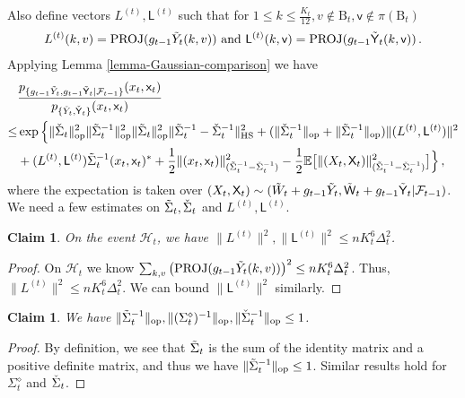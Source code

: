 \documentclass[11pt]{article}
\newtheorem{Claim}[Theorem]{Claim}
\numberwithin{equation}{section}
\begin{document}
Also define vectors $L^{(t)},\mathsf{L}^{(t)}$ such that for $1\leq k\leq \frac{K_t}{12}, v\not\in \mathrm{B}_t, \mathsf v\not\in \pi(\mathrm{B}_t)$ 
\begin{align*}
    L^{(t)} (k,v) = \mathrm{PROJ} ( g_{t-1} \Tilde{Y}_{t}(k,v) ) \mbox{ and }\mathsf{L}^{(t)} (k,\mathsf{v}) = \mathrm{PROJ}( g_{t-1} \Tilde{\mathsf{Y}}_{t}(k,\mathsf{v}) ) \,.
\end{align*}
Applying Lemma \ref{lemma-Gaussian-comparison} we have
\begin{align}
    & \frac{ p_{ \{ g_{t-1} \Tilde{Y}_t , g_{t-1} \Tilde{\mathsf{Y}}_t | \mathcal{F}_{t-1} \} } (x_{t}, \mathsf{x}_{t}) }{ p_{ \{ \Check{Y}_t ,   \Check{\mathsf{Y}}_t \} } (x_{t}, \mathsf{x}_{t}) } \nonumber \\
    \leq & \exp \Big\{ \| \Check{\Sigma}_t \|_{\mathrm{op}}^2 \| \Tilde{\Sigma}_{t}^{-1} \|_{\mathrm{op}}^2 \| \Tilde{\Sigma}_{t} \|_{\mathrm{op}}^2 \| \Tilde{\Sigma}_{t}^{-1} - \Check{\Sigma}_{t}^{-1} \|_{\mathrm{HS}}^2 + ( \| \Check{\Sigma}_{t}^{-1} \|_{\mathrm{op}} + \| \Tilde{\Sigma}_{t}^{-1} \|_{\mathrm{op}} ) \| ( L^{(t)} , \mathsf{L}^{(t)} ) \|^2 \nonumber \\
    & + ( L^{(t)} , \mathsf{L}^{(t)} ) \Tilde{\Sigma}_{t}^{-1} ( x_{t},\mathsf{x}_{t} )^{*} 
    + \frac{1}{2} \| ( x_{t} , \mathsf{x}_{t} ) \|^2_{ (\Tilde{\Sigma}_{t}^{-1} - \Check{\Sigma}_{t}^{-1}) } - \frac{1}{2} \mathbb{E} \big[ \| ( X_{t} , \mathsf{X}_{t} ) \|^2_{ (\Tilde{\Sigma}_{t}^{-1} - \Check{\Sigma}_{t}^{-1}) } \big]  \Big\} \,,
    \label{equ-density-ratio-II}
\end{align}
where the expectation is taken over $(X_{t}, \mathsf{X}_{t}) \sim ( \Tilde{W}_t + g_{t-1} \Tilde{Y}_t , \Tilde{\mathsf{W}}_t + g_{t-1} \Tilde{\mathsf{Y}}_t | \mathcal{F}_{t-1} )$. We need a few estimates on $\Tilde{\Sigma}_{t},\Check{\Sigma}_{t}$ and $L^{(t)}, \mathsf{L}^{(t)}$.

\begin{Claim} \label{claim-2-norm-L}
On the event $\mathcal H_t$, we have $\| L^{(t)} \|^2, \| \mathsf{L}^{(t)} \|^2 \leq n K_{t}^6 \Delta_{t}^2$.
\end{Claim}
\begin{proof}
On $\mathcal{H}_{t}$ we know $\sum_{k,v} \big( \mathrm{PROJ} ( g_{t-1}\Tilde{Y}_t(k,v) ) \big)^2 \leq n K_{t}^6 \Delta_{t}^2$. Thus, $\| L^{(t)} \|^2 \leq n K_{t}^6 \Delta_{t}^2$. We can bound $\| \mathsf{L}^{(t)} \|^2$ similarly.
\end{proof}

\begin{Claim} \label{claim-op-norm-W}
We have $\| \Tilde{\Sigma}_{t}^{-1} \|_{\mathrm{op}}, \| (\Sigma^{\diamond}_{t})^{-1} \|_{\mathrm{op}}, \| \Check{\Sigma}_{t}^{-1} \|_{\mathrm{op}} \leq 1$.
\end{Claim}
\begin{proof}
By definition, we see that $\Tilde{\Sigma}_t$ is the sum of the identity matrix and a positive definite matrix, and thus we have $\| \Tilde{\Sigma}_{t}^{-1} \|_{\mathrm{op}} \leq 1$. Similar results hold for $\Sigma^{\diamond}_{t}$ and $\Check{\Sigma}_{t}$.
\end{proof}
\end{document}

